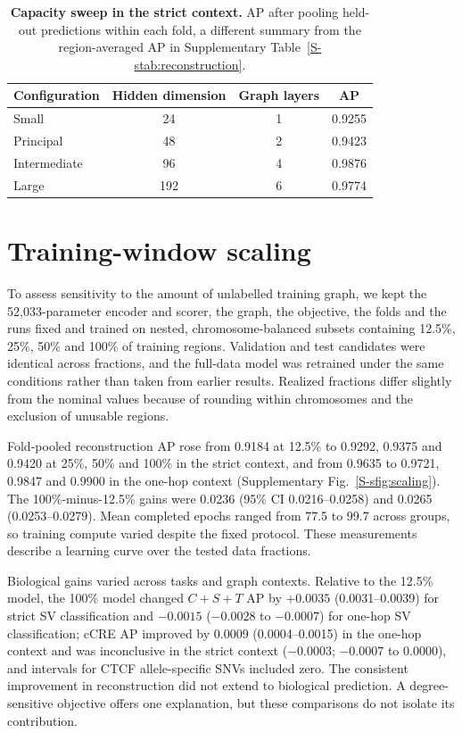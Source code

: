 \documentclass[11pt]{article}
\newcommand{\CI}{95\% CI\xspace}
\begin{document}
\begin{bibunit}[unsrtnat]
\begin{table}[H]
\centering
\caption{\textbf{Capacity sweep in the strict context.} AP after pooling held-out predictions within each fold, a different summary from the region-averaged AP in Supplementary Table~\ref{S-stab:reconstruction}.}
\label{S-stab:capacity}
\small
\begin{tabular}{@{}lccc@{}}
\toprule
Configuration & Hidden dimension & Graph layers & AP \\
\midrule
Small & 24 & 1 & 0.9255 \\
Principal & 48 & 2 & 0.9423 \\
Intermediate & 96 & 4 & 0.9876 \\
Large & 192 & 6 & 0.9774 \\
\bottomrule
\end{tabular}
\end{table}

\section{Training-window scaling}
\label{S-snote:scaling}

To assess sensitivity to the amount of unlabelled training graph, we kept the 52,033-parameter encoder and scorer, the graph, the objective, the folds and the runs fixed and trained on nested, chromosome-balanced subsets containing 12.5\%, 25\%, 50\% and 100\% of training regions. Validation and test candidates were identical across fractions, and the full-data model was retrained under the same conditions rather than taken from earlier results. Realized fractions differ slightly from the nominal values because of rounding within chromosomes and the exclusion of unusable regions.

Fold-pooled reconstruction AP rose from 0.9184 at 12.5\% to 0.9292, 0.9375 and 0.9420 at 25\%, 50\% and 100\% in the strict context, and from 0.9635 to 0.9721, 0.9847 and 0.9900 in the one-hop context (Supplementary Fig.~\ref{S-sfig:scaling}). The 100\%-minus-12.5\% gains were 0.0236 (\CI 0.0216--0.0258) and 0.0265 (0.0253--0.0279). Mean completed epochs ranged from 77.5 to 99.7 across groups, so training compute varied despite the fixed protocol. These measurements describe a learning curve over the tested data fractions.

Biological gains varied across tasks and graph contexts. Relative to the 12.5\% model, the 100\% model changed $C+S+T$ AP by $+0.0035$ (0.0031--0.0039) for strict SV classification and $-0.0015$ ($-0.0028$ to $-0.0007$) for one-hop SV classification; cCRE AP improved by 0.0009 (0.0004--0.0015) in the one-hop context and was inconclusive in the strict context ($-0.0003$; $-0.0007$ to 0.0000), and intervals for CTCF allele-specific SNVs included zero. The consistent improvement in reconstruction did not extend to biological prediction. A degree-sensitive objective offers one explanation, but these comparisons do not isolate its contribution.


\end{bibunit}
\end{document}
